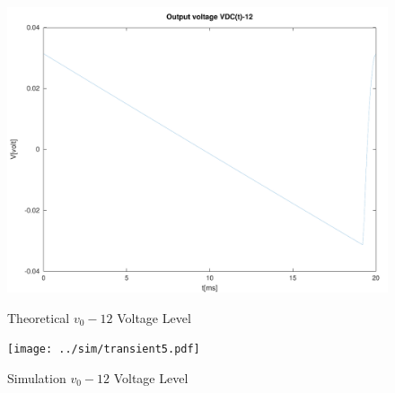 \begin{figure}[H]
      \includegraphics[width=\linewidth]{../mat/v012.pdf}
      \caption{Theoretical $v_0-12$ Voltage Level}
    \endminipage\hfill
      \texttt{[image: ../sim/transient5.pdf]}
      \caption{Simulation $v_0-12$ Voltage Level}
    \endminipage\hfill
\end{figure}